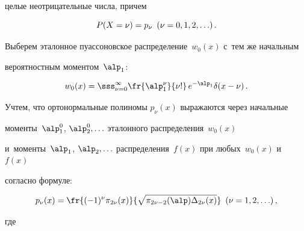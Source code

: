  целые неотрицательные числа, причем

 \begin{equation*}

 P(X=\nu)=p_\nu \enskip (\nu = 0,1,2,\ldots)\,.


 \end{equation*}

Выберем эталонное пуассоновское распределение~$w_0(x)$ с~тем же начальным 

вероятностным моментом~$\alp_1$:

\begin{equation*}

w_0(x) = \sss_{\nu=0}^\infty \fr{\alp_1^{\nu}}{\nu!}\, e^{-\alp_1} \delta (x-\nu)\,.


\end{equation*}

Учтем, что ортонормальные полиномы $p_\nu(x)$ выражаются через начальные 

моменты~$\alp_1^0$, $\alp_2^0 ,\ldots$ эталонного распределения~$w_0(x)$ 

и~моменты~$\alp_1$, $\alp_2 ,\ldots$ распределения~$f(x)$ при любых~$w_0(x)$ и~$f(x)$ 

согласно формуле:

    \begin{equation*}

    p_\nu (x) = \fr{(-1)^\nu\pi_{2\nu} (x)}{\sqrt{\pi_{2\nu-2} (\alp)

     \Delta_{2\nu} (x)}} \enskip (\nu= 1,2,\ldots)\,,


     \end{equation*}

где



\noindent

